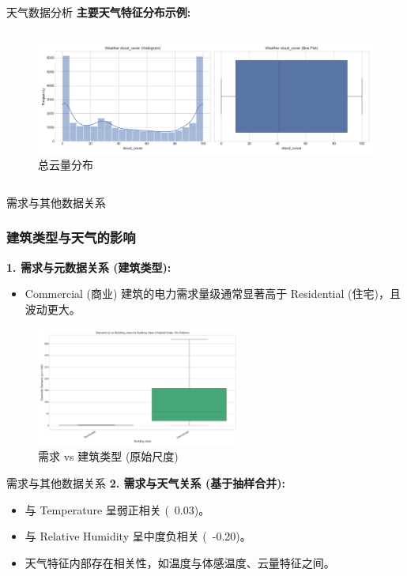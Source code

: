 \documentclass{beamer} %
\begin{document}
\begin{frame}{天气数据分析}
    \textbf{主要天气特征分布示例:}
    \begin{columns}
        \begin{column}{\textwidth}
            \centering
                \begin{figure}
                \includegraphics[width=\textwidth]{../plots/weather_distribution_cloud_cover.png}
                \caption{总云量分布}
            \end{figure}
        \end{column}
    \end{columns}
\end{frame}

\begin{frame}{需求与其他数据关系}
    \frametitle{建筑类型与天气的影响}
    \textbf{1. 需求与元数据关系 (建筑类型):}
    \begin{itemize}
        \item Commercial (商业) 建筑的电力需求量级通常显著高于 Residential (住宅)，且波动更大。
    \end{itemize}
    \begin{figure}[H]
        \centering
        \includegraphics[width=0.6\textwidth]{../plots/demand_vs_building_class_boxplot_orig.png}
        \caption{需求 vs 建筑类型 (原始尺度)}
    \end{figure}
\end{frame}

\begin{frame}{需求与其他数据关系}
    \textbf{2. 需求与天气关系 (基于抽样合并):}
    \begin{itemize}
        \item 与 Temperature 呈弱正相关 (~0.03)。
        \item 与 Relative Humidity 呈中度负相关 (~-0.20)。
        \item 天气特征内部存在相关性，如温度与体感温度、云量特征之间。
    \end{itemize}
\end{frame}
\end{document}
